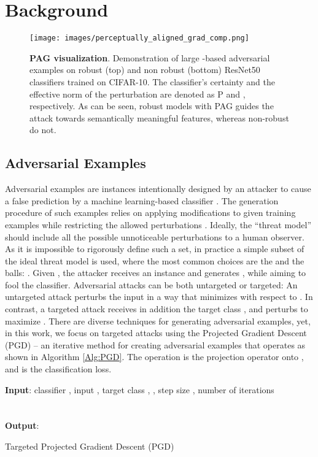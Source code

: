 \documentclass[10pt]{article} \usepackage[accepted]{tmlr}
\begin{document}
\section{Background}

\begin{figure}[t]
    \centering
    \texttt{[image: images/perceptually\_aligned\_grad\_comp.png]}
    \caption{\textbf{PAG visualization}.
    Demonstration of large -based adversarial examples on robust (top) and non robust (bottom) ResNet50 classifiers \citep{he2015deep} trained on CIFAR-10. The classifier's certainty and the effective  norm of the perturbation   are denoted as P and , respectively. As can be seen, robust models with PAG guides the attack towards semantically meaningful features, whereas non-robust do not.
    }
    \label{fig:perceptually_aligned_gradients}
\end{figure}

\subsection{Adversarial Examples}
Adversarial examples are instances intentionally designed by an attacker to cause a false prediction by a machine learning-based classifier \citep{szegedy2014intriguing, goodfellow2015explaining, kurakin2017adversarial}.
The generation procedure of such examples relies on applying modifications to given training examples while restricting the allowed perturbations .
Ideally, the “threat model”  should include all the possible unnoticeable perturbations to a human observer.
As it is impossible to rigorously define such a set, in practice a simple subset of the ideal threat model is used, where the most common choices are the  and the  balls: .
Given , the attacker receives an instance  and generates , while aiming to fool the classifier.
Adversarial attacks can be both untargeted or targeted: An untargeted attack perturbs the input in a way that minimizes  with respect to . 
In contrast, a targeted attack receives in addition the target class , and perturbs  to maximize .
There are diverse techniques for generating adversarial examples, yet, in this work, we focus on targeted attacks using the Projected Gradient Descent (PGD) \citep{madry2019deep}-- an iterative method for creating adversarial examples that operates as shown in Algorithm \ref{Alg:PGD}.
The operation  is the projection operator onto , and  is the classification loss.

\begin{algorithm}[ht]
\SetAlgoLined
    \textbf{Input}: classifier , input , target class , , step size , number of iterations \\
    \\
     \\
    \textbf{Output}: 
    \caption{Targeted Projected Gradient Descent (PGD)}
    \label{Alg:PGD}
\end{algorithm}
\end{document}
